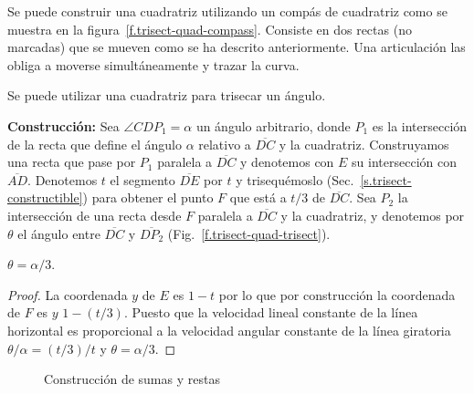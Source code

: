 Se puede construir una cuadratriz utilizando un compás de cuadratriz como se muestra en la figura~\ref{f.trisect-quad-compass}. Consiste en dos rectas (no marcadas) que se mueven como se ha descrito anteriormente. Una articulación las obliga a moverse simultáneamente y trazar la curva.

Se puede utilizar una cuadratriz para trisecar un ángulo.

\noindent\textbf{Construcción:}
Sea $\angle CDP_1=\alpha$ un ángulo arbitrario, donde $P_1$ es la intersección de la recta que define el ángulo $\alpha$ relativo a $\overline{DC}$ y la cuadratriz. Construyamos una recta que pase por $P_1$ paralela a $\overline{DC}$ y denotemos con $E$ su intersección con $\overline{AD}$. Denotemos $t$ el segmento $\overline{DE}$ por $t$ y trisequémoslo (Sec.~\ref{s.trisect-constructible}) para obtener el punto $F$ que está a $t/3$ de $\overline{DC}$. Sea $P_2$ la intersección de una recta desde $F$ paralela a $\overline{DC}$ y la cuadratriz, y denotemos por $\theta$ el ángulo entre $\overline{DC}$ y $\overline{DP_2}$ (Fig.~\ref{f.trisect-quad-trisect}).

\begin{theorem}
$\theta = \alpha/3$.
\end{theorem}
\begin{proof}
La coordenada $y$ de $E$ es $1-t$ por lo que por construcción la coordenada de $F$ es $y$ $1-(t/3)$. Puesto que la velocidad lineal constante de la línea horizontal es proporcional a la velocidad angular constante de la línea giratoria $\theta/\alpha = (t/3)/t$ y $\theta = \alpha/3$.
\end{proof}


\begin{figure}[t]
\begin{center}
\end{center}
\caption{Construcción de sumas y restas}\label{f.trisect-add-subtract}
\end{figure}

